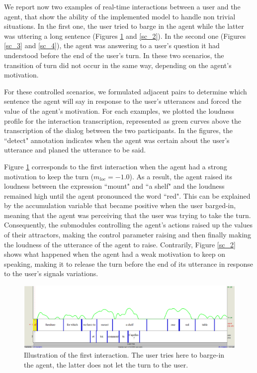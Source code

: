 We report now two examples of real-time interactions between a user and the agent, that show the ability of the implemented model to handle non trivial situations. In the first one, the user tried to barge in the agent while the latter was uttering a long sentence (Figures \ref{sc_1} and \ref{sc_2}). In the second one (Figures \ref{sc_3} and \ref{sc_4}), the agent was answering to a user's question it had understood before the end of the user's turn. In these two scenarios, the transition of turn did not occur in the same way, depending on the agent's motivation. 
 
For these controlled scenarios, we formulated adjacent pairs to determine which sentence the agent will say in response to the user's utterances and forced the value of the agent's motivation. 
For each examples, we plotted the loudness profile for the interaction transcription, represented as green curves above the transcription of the dialog between the two participants. In the figures, the ``detect" annotation indicates when the agent was certain about the user's utterance and planed the utterance to be said. 

Figure \ref{sc_1} corresponds to the first interaction when the agent had a strong motivation to keep the turn ($m_{loc}=-1.0$). 
As a result, the agent raised its loudness between the expression ``mount" and ``a shelf" and the loudness remained high until the agent pronounced the word ``red". This can be explained by the accumulation variable that became positive when the user barged-in, meaning that the agent was perceiving that the user was trying to take the turn. 
Consequently, the submodules controlling the agent's actions raised up the values of their attractors, making the control parameter raising and then finally making the loudness of the utterance of the agent to raise. 
Contrarily, Figure \ref{sc_2} shows what happened when the agent had a weak motivation to keep on speaking, making it to release the turn before the end of its utterance in response to the user's signals variations.

\begin{figure}
  \centering
  \includegraphics[width=\linewidth]{figure/volume_transcript_1_1.png}
  \caption{Illustration of the first interaction. The user tries here to barge-in the agent, the latter does not let the turn to the user.}
  \label{sc_1}
\end{figure}

